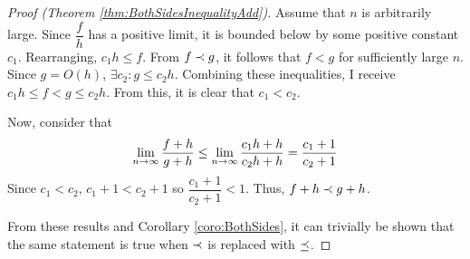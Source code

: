 \begin{proof}[Proof (Theorem \ref{thm:BothSidesInequalityAdd})]
	Assume that $n$ is arbitrarily large. Since $\dfrac{f}{h}$ has a positive limit, it is bounded below by some positive constant $c_1$. Rearranging, $c_1 h \leq f$. From $f \prec g$, it follows that $f < g$ for sufficiently large $n$. Since $g = O(h)$, $\exists c_2 : g \leq c_2 h$. Combining these inequalities, I receive $c_1 h \leq f < g \leq c_2 h$. From this, it is clear that $c_1 < c_2$.
	
	Now, consider that
	\begin{align*}
	\lim_{n \to \infty} \frac{f + h}{g + h} \leq \lim_{n \to \infty} \frac{c_1 h + h}{c_2 h + h} = \frac{c_1 + 1}{c_2 + 1}
	\end{align*}
	Since $c_1 < c_2$, $c_1 + 1 < c_2 + 1$ so $\dfrac{c_1 + 1}{c_2 + 1} < 1$. Thus, $f + h \prec g + h$.
	
	From these results and Corollary \ref{coro:BothSides}, it can trivially be shown that the same statement is true when $\prec$ is replaced with $\preceq$.
\end{proof}